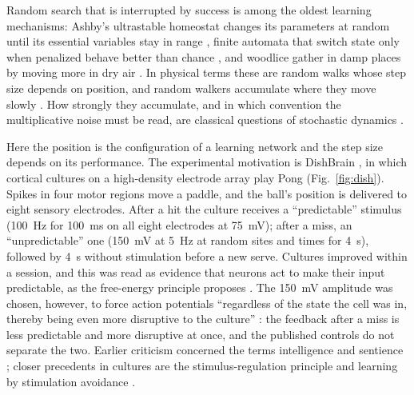 \documentclass[pre,twocolumn,superscriptaddress,showpacs=false,amsmath,amssymb,nofootinbib]{revtex4-2}
\begin{document}
Random search that is interrupted by success is among the oldest learning mechanisms: Ashby's ultrastable homeostat changes its parameters at random until its essential variables stay in range \cite{Ashby1952}, finite automata that switch state only when penalized behave better than chance \cite{Tsetlin1961,Tsetlin1963,Robbins1952}, and woodlice gather in damp places by moving more in dry air \cite{Gunn1937}. In physical terms these are random walks whose step size depends on position, and random walkers accumulate where they move slowly \cite{Schnitzer1993,vanKampen1988,Landauer1988}. How strongly they accumulate, and in which convention the multiplicative noise must be read, are classical questions of stochastic dynamics \cite{Volpe2016}.

Here the position is the configuration of a learning network and the step size depends on its performance. The experimental motivation is DishBrain \cite{Kagan2022}, in which cortical cultures on a high-density electrode array play Pong (Fig.~\ref{fig:dish}). Spikes in four motor regions move a paddle, and the ball's position is delivered to eight sensory electrodes. After a hit the culture receives a ``predictable'' stimulus (100~Hz for 100~ms on all eight electrodes at 75~mV); after a miss, an ``unpredictable'' one (150~mV at 5~Hz at random sites and times for 4~s), followed by 4~s without stimulation before a new serve. Cultures improved within a session, and this was read as evidence that neurons act to make their input predictable, as the free-energy principle proposes \cite{Friston2010,Kagan2022}. The 150~mV amplitude was chosen, however, to force action potentials ``regardless of the state the cell was in, thereby being even more disruptive to the culture'' \cite{Kagan2022}: the feedback after a miss is less predictable and more disruptive at once, and the published controls do not separate the two. Earlier criticism concerned the terms intelligence and sentience \cite{Balci2023,Kagan2023reply}; closer precedents in cultures are the stimulus-regulation principle \cite{Shahaf2001,Marom2002} and learning by stimulation avoidance \cite{Sinapayen2017,Masumori2020}.
\end{document}
